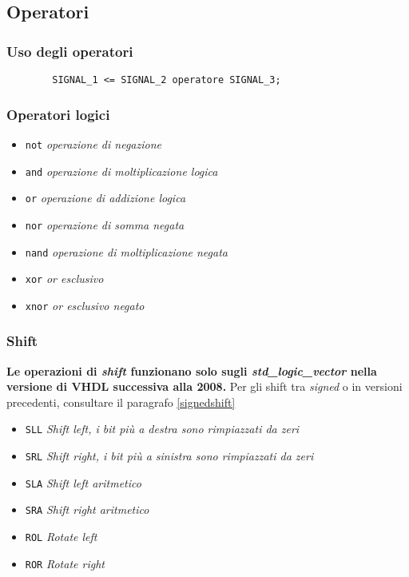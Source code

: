 \documentclass{article}
\begin{document}
\subsection{Operatori}
\subsubsection{Uso degli operatori}
\begin{verbatim}
	    SIGNAL_1 <= SIGNAL_2 operatore SIGNAL_3;
\end{verbatim}

\subsubsection{Operatori logici}
\begin{itemize}
  \item \texttt{not} \textit{operazione di negazione}
  \item \texttt{and} \textit{operazione di moltiplicazione logica}
  \item \texttt{or} \textit{operazione di addizione logica}
  \item \texttt{nor} \textit{operazione di somma negata}
  \item \texttt{nand} \textit{operazione di moltiplicazione negata}
  \item \texttt{xor} \textit{or esclusivo}
  \item \texttt{xnor} \textit{or esclusivo negato}
\end{itemize}

\newpage

\subsubsection{Shift}

\textbf{Le operazioni di \textit{shift} funzionano solo sugli \textit{std\_logic\_vector} nella versione di VHDL successiva alla 2008.} Per gli shift tra \textit{signed} o in versioni precedenti, consultare il paragrafo \ref{signedshift}

\begin{itemize}
  \item \texttt{SLL} \textit{Shift left, i bit più a destra sono rimpiazzati da zeri}
  \item \texttt{SRL} \textit{Shift right, i bit più a sinistra sono rimpiazzati da zeri}
  \item \texttt{SLA} \textit{Shift left aritmetico}
  \item \texttt{SRA} \textit{Shift right aritmetico}
  \item \texttt{ROL} \textit{Rotate left}
  \item \texttt{ROR} \textit{Rotate right}
\end{itemize}
\end{document}
